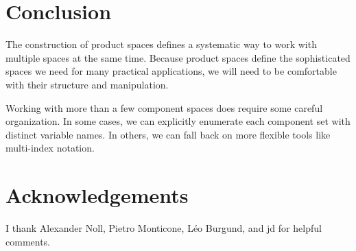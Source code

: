 \documentclass[
  letterpaper,
  DIV=11,
  numbers=noendperiod]{scrartcl}
\begin{document}
\section{Conclusion}\label{conclusion}

The construction of product spaces defines a systematic way to work with
multiple spaces at the same time. Because product spaces define the
sophisticated spaces we need for many practical applications, we will
need to be comfortable with their structure and manipulation.

Working with more than a few component spaces does require some careful
organization. In some cases, we can explicitly enumerate each component
set with distinct variable names. In others, we can fall back on more
flexible tools like multi-index notation.

\section*{Acknowledgements}\label{acknowledgements}

I thank Alexander Noll, Pietro Monticone, Léo Burgund, and jd for
helpful comments.
\end{document}
